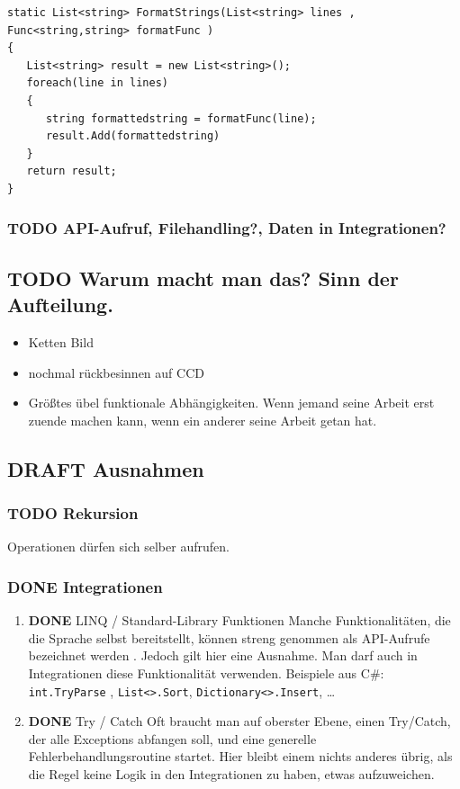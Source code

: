 \documentclass[11pt]{article}
\begin{document}
\begin{verbatim}
static List<string> FormatStrings(List<string> lines , Func<string,string> formatFunc )
{
   List<string> result = new List<string>();
   foreach(line in lines)
   {
      string formattedstring = formatFunc(line);
      result.Add(formattedstring) 
   }
   return result;
}
\end{verbatim}


\subsubsection{{\bfseries\sffamily TODO} API-Aufruf, Filehandling?, Daten in Integrationen?}
\label{sec:orgheadline36}
\subsection{{\bfseries\sffamily TODO} Warum macht man das? Sinn der Aufteilung.}
\label{sec:orgheadline38}
\begin{itemize}
\item Ketten Bild
\item nochmal rückbesinnen auf CCD
\item Größtes übel funktionale Abhängigkeiten. Wenn jemand seine Arbeit erst zuende machen kann, wenn ein anderer seine Arbeit getan hat.
\end{itemize}
\subsection{{\bfseries\sffamily DRAFT} Ausnahmen}
\label{sec:orgheadline43}
\subsubsection{{\bfseries\sffamily TODO} Rekursion}
\label{sec:orgheadline39}
Operationen dürfen sich selber aufrufen.
\subsubsection{{\bfseries\sffamily DONE} Integrationen}
\label{sec:orgheadline42}
\begin{enumerate}
\item {\bfseries\sffamily DONE} LINQ / Standard-Library Funktionen
\label{sec:orgheadline40}
Manche Funktionalitäten, die die Sprache selbst bereitstellt, können streng genommen als API-Aufrufe bezeichnet werden
. Jedoch gilt hier eine Ausnahme. Man darf auch in Integrationen diese Funktionalität verwenden.
Beispiele aus C\#:
\texttt{int.TryParse} , \texttt{List<>.Sort}, \texttt{Dictionary<>.Insert}, \ldots{}

\item {\bfseries\sffamily DONE} Try / Catch
\label{sec:orgheadline41}
Oft braucht man auf oberster Ebene, einen Try/Catch, der alle Exceptions abfangen soll, und eine generelle Fehlerbehandlungsroutine
startet. Hier bleibt einem nichts anderes übrig, als die Regel keine Logik in den Integrationen zu haben, etwas aufzuweichen.
\end{enumerate}
\end{document}
